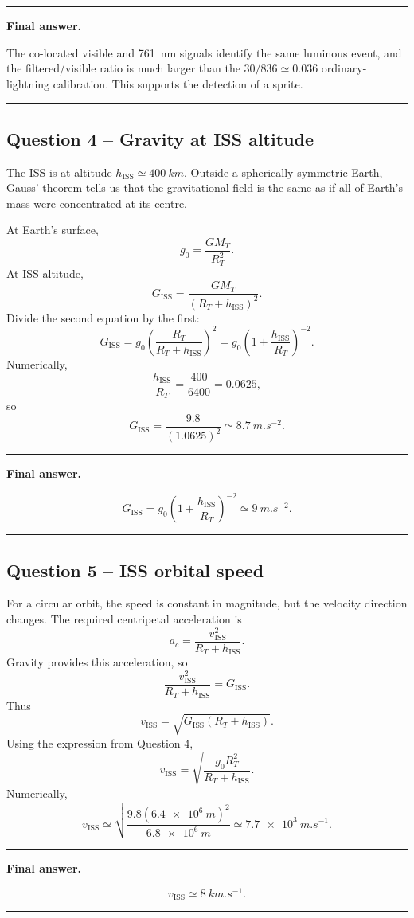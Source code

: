 \documentclass[11pt,a4paper]{article}
\newenvironment{finalanswer}{%
  \begin{center}\begin{minipage}{0.94\linewidth}\hrule\vspace{0.45em}\textbf{Final answer. }%
}{%
  \vspace{0.45em}\hrule\end{minipage}\end{center}%
}
\newcommand{\RT}{R_T}
\newcommand{\ISS}{\mathrm{ISS}}
\begin{document}
\begin{finalanswer}
The co-located visible and \SI{761}{nm} signals identify the same luminous event, and the filtered/visible ratio is much larger than the $30/836\simeq0.036$ ordinary-lightning calibration. This supports the detection of a sprite.
\end{finalanswer}

\subsection*{Question 4 -- Gravity at ISS altitude}

The ISS is at altitude $h_{\ISS}\simeq\SI{400}{km}$. Outside a spherically symmetric Earth, Gauss' theorem tells us that the gravitational field is the same as if all of Earth's mass were concentrated at its centre.

At Earth's surface,
\[
 g_0=\frac{G M_T}{\RT^2}.
\]
At ISS altitude,
\[
 G_{\ISS}=\frac{G M_T}{(\RT+h_{\ISS})^2}.
\]
Divide the second equation by the first:
\[
 G_{\ISS}=g_0\left(\frac{\RT}{\RT+h_{\ISS}}\right)^2
          =g_0\left(1+\frac{h_{\ISS}}{\RT}\right)^{-2}.
\]
Numerically,
\[
 \frac{h_{\ISS}}{\RT}=\frac{400}{6400}=0.0625,
\]
so
\[
 G_{\ISS}=\frac{9.8}{(1.0625)^2}\simeq\SI{8.7}{m.s^{-2}}.
\]

\begin{finalanswer}
\[
G_{\ISS}=g_0\left(1+\frac{h_{\ISS}}{\RT}\right)^{-2}\simeq\SI{9}{m.s^{-2}}.
\]
\end{finalanswer}

\subsection*{Question 5 -- ISS orbital speed}

For a circular orbit, the speed is constant in magnitude, but the velocity direction changes. The required centripetal acceleration is
\[
 a_c=\frac{v_{\ISS}^2}{\RT+h_{\ISS}}.
\]
Gravity provides this acceleration, so
\[
 \frac{v_{\ISS}^2}{\RT+h_{\ISS}}=G_{\ISS}.
\]
Thus
\[
 v_{\ISS}=\sqrt{G_{\ISS}(\RT+h_{\ISS})}.
\]
Using the expression from Question 4,
\[
 v_{\ISS}=\sqrt{\frac{g_0\RT^2}{\RT+h_{\ISS}}}.
\]
Numerically,
\[
 v_{\ISS}\simeq\sqrt{\frac{9.8(\SI{6.4e6}{m})^2}{\SI{6.8e6}{m}}}
 \simeq \SI{7.7e3}{m.s^{-1}}.
\]

\begin{finalanswer}
\[
v_{\ISS}\simeq\SI{8}{km.s^{-1}}.
\]
\end{finalanswer}
\end{document}
